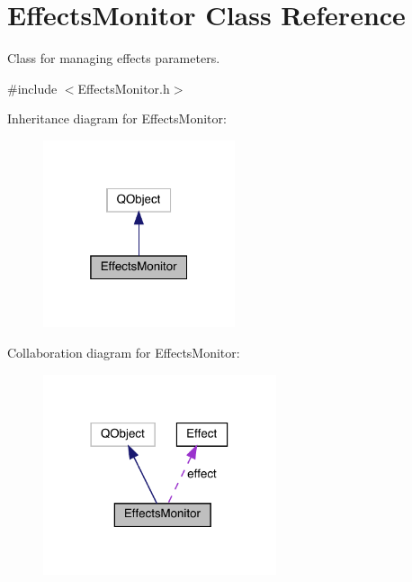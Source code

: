 \hypertarget{class_effects_monitor}{}\section{Effects\+Monitor Class Reference}
\label{class_effects_monitor}


Class for managing effects parameters.  




{\ttfamily \#include $<$Effects\+Monitor.\+h$>$}



Inheritance diagram for Effects\+Monitor\+:
\nopagebreak
\begin{figure}[H]
\begin{center}
\leavevmode
\includegraphics[width=160pt]{class_effects_monitor__inherit__graph}
\end{center}
\end{figure}


Collaboration diagram for Effects\+Monitor\+:
\nopagebreak
\begin{figure}[H]
\begin{center}
\leavevmode
\includegraphics[width=194pt]{class_effects_monitor__coll__graph}
\end{center}
\end{figure}
